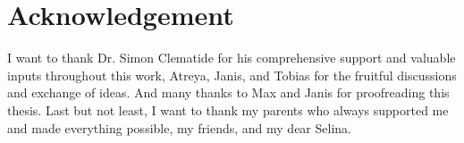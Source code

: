 {}
\chapter*{Acknowledgement}

I want to thank Dr. Simon Clematide for his comprehensive support and valuable inputs throughout
this work, Atreya, Janis, and Tobias for the fruitful discussions and exchange of ideas. And many
thanks to Max and Janis for proofreading this thesis. Last but not least, I want to thank my parents
who always supported me and made everything possible, my friends, and my dear Selina.


\newpage
